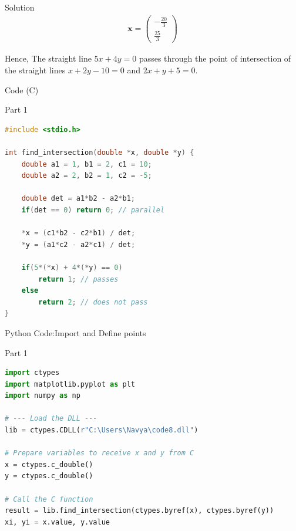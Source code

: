 \documentclass{beamer}
\begin{document}
\begin{frame}{Solution}
\begin{align}
\mathbf{x}=\begin{pmatrix}-\tfrac{20}{3}\\[4pt]\tfrac{25}{3}\end{pmatrix}
\end{align}

Hence, The straight line $5x+4y=0$ passes through the point of intersection of the straight lines $x+2y-10 = 0$ and $2x+y+5 = 0$. 

\end{frame}

\begin{frame}[fragile]{ Code (C)}
\begin{block}{Part 1}
\begin{lstlisting}[language=C, basicstyle=\ttfamily\small, keywordstyle=\color{blue}, frame=single]
#include <stdio.h>

int find_intersection(double *x, double *y) {
    double a1 = 1, b1 = 2, c1 = 10;
    double a2 = 2, b2 = 1, c2 = -5;

    double det = a1*b2 - a2*b1;
    if(det == 0) return 0; // parallel

    *x = (c1*b2 - c2*b1) / det;
    *y = (a1*c2 - a2*c1) / det;

    if(5*(*x) + 4*(*y) == 0)
        return 1; // passes
    else
        return 2; // does not pass
}
\end{lstlisting}
\end{block}
\end{frame}


\begin{frame}[fragile]{Python Code:Import and Define points}
\begin{block}{Part 1}
\begin{lstlisting}[language=Python, basicstyle=\ttfamily\small, keywordstyle=\color{blue}, frame=single]
import ctypes
import matplotlib.pyplot as plt
import numpy as np

# --- Load the DLL ---
lib = ctypes.CDLL(r"C:\Users\Navya\code8.dll")

# Prepare variables to receive x and y from C
x = ctypes.c_double()
y = ctypes.c_double()

# Call the C function
result = lib.find_intersection(ctypes.byref(x), ctypes.byref(y))
xi, yi = x.value, y.value
\end{lstlisting}
\end{block}
\end{frame}
\end{document}
